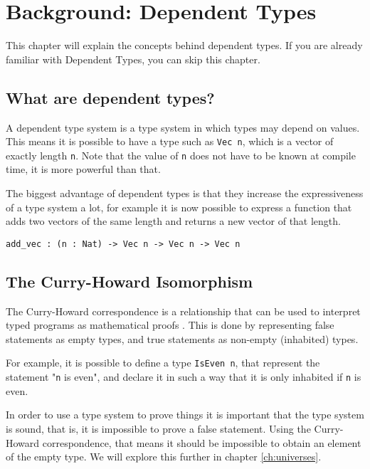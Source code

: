 \chapter{\label{chap:bg-dp}Background: Dependent Types}

This chapter will explain the concepts behind dependent types. If you are already familiar with Dependent Types, you can skip this chapter. 

\section{What are dependent types?}

A dependent type system is a type system in which types may depend on values. This means it is possible to have a type such as \verb|Vec n|, which is a vector of exactly length \verb|n|. Note that the value of \verb|n| does not have to be known at compile time, it is more powerful than that. 

The biggest advantage of dependent types is that they increase the expressiveness of a type system a lot, for example it is now possible to express a function that adds two vectors of the same length and returns a new vector of that length. 
\begin{lstlisting}
add_vec : (n : Nat) -> Vec n -> Vec n -> Vec n
\end{lstlisting}

\section{The Curry-Howard Isomorphism}

The Curry-Howard correspondence is a relationship that can be used to interpret typed programs as mathematical proofs \cite{chc}. This is done by representing false statements as empty types, and true statements as non-empty (inhabited) types. 

For example, it is possible to define a type \verb|IsEven n|, that represent the statement "\verb|n| is even", and declare it in such a way that it is only inhabited if \verb|n| is even.

In order to use a type system to prove things it is important that the type system is sound, that is, it is impossible to prove a false statement. Using the Curry-Howard correspondence, that means it should be impossible to obtain an element of the empty type. We will explore this further in chapter \ref{ch:universes}.

